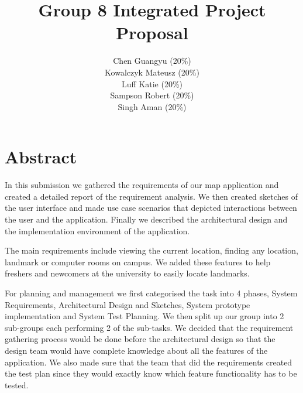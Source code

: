 \documentclass[10pt,a4paper,oneside]{report}
\begin{document}
\title{Group 8 Integrated Project Proposal}

\author{
  Chen Guangyu (20\%)\\
  Kowalczyk Mateusz (20\%)\\
  Luff Katie (20\%)\\
  Sampson Robert (20\%)\\
  Singh Aman (20\%)\\ }
\maketitle
\section*{Abstract}
In this submission we gathered the requirements of our map application and created a detailed report of the requirement analysis. We then created sketches of the user interface and made use case scenarios that depicted interactions between the user and the application. Finally we described the architectural design and the implementation environment of the application.

The main requirements include viewing the current location, finding any location, landmark or computer rooms on campus. We added these features to help freshers and newcomers at the university to easily locate landmarks.

For planning and management we first categorised the task into 4 phases, System Requirements, Architectural Design and Sketches, System prototype implementation and System Test Planning.  We then split up our group into 2 sub-groups each performing 2 of the sub-tasks.
We decided that the requirement gathering process would be done before the architectural design so that the design team would have complete knowledge about all the features of the application.
We also made sure that the team that did the requirements created the test plan since they would exactly know which feature functionality has to be tested.
\end{document}
